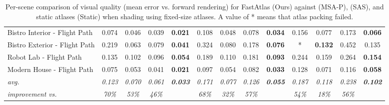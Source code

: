 \begin{table*}[t]
\begin{tabular}{l cccc|cccc|cccc}
Bistro Interior - Flight Path & 0.074           & 0.046          & 0.039          & \textbf{0.021}          & 0.108           & 0.048          & 0.078          & \textbf{0.034}          & 0.156           & 0.077          & 0.173          & \textbf{0.066}          \\
Bistro Exterior - Flight Path & 0.219           & 0.063          & 0.079          & \textbf{0.041}          & 0.324           & 0.080          & 0.178          & \textbf{0.076}          & *               & \textbf{0.132} & 0.452          & 0.135                   \\
Robot Lab - Flight Path       & 0.135           & 0.102          & 0.096          & \textbf{0.054}          & 0.189           & 0.110          & 0.181          & \textbf{0.093}          & 0.244           & 0.159          & 0.264          & \textbf{0.154}          \\
Modern House - Flight Path    & 0.075           & 0.053          & 0.041          & \textbf{0.021}          & 0.097           & 0.054          & 0.082          & \textbf{0.033}          & 0.128           & 0.071          & 0.116          & \textbf{0.058}          \\
\hline
\textit{avg.}                 & \textit{0.123}  & \textit{0.070} & \textit{0.061} & \textit{\textbf{0.033}} & \textit{0.171}  & \textit{0.077} & \textit{0.126} & \textit{\textbf{0.055}} & \textit{0.187}  & \textit{0.118} & \textit{0.238} & \textit{\textbf{0.102}} \\
\textit{improvement vs.}      & \textit{70\%}   & \textit{53\%}  & \textit{46\%}  &                         & \textit{68\%}   & \textit{32\%}  & \textit{57\%}  &                         & \textit{54\%}   & \textit{18\%}  & \textit{56\%}  &                        
\end{tabular}

\vspace{1mm}
\caption{Per-scene comparison of visual quality (mean \FLIP error vs. forward rendering) for FastAtlas (Ours) against \cite{Neff2022MSA} (MSA-P), \cite{mueller2018shading} (SAS), and static atlases (Static) when shading using fixed-size atlases. A value of * means that atlas packing failed.}
\label{tab:supp_flip_fixed_atlas}
\vspace{-3mm}
\end{table*}
